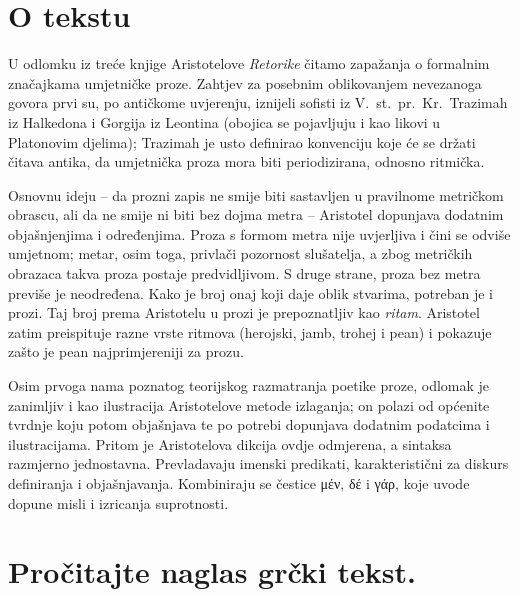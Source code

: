 


\section*{O tekstu}

U odlomku iz treće knjige Aristotelove \textit{Retorike} čitamo zapažanja o formalnim značajkama umjetničke proze. Zahtjev za posebnim oblikovanjem nevezanoga govora prvi su, po antičkome uvjerenju, iznijeli sofisti iz V.~st.\ pr.~Kr.\ Trazimah iz Halkedona i Gorgija iz Leontina (obojica se pojavljuju i kao likovi u Platonovim djelima); Trazimah je usto definirao konvenciju koje će se držati čitava antika, da umjetnička proza mora biti periodizirana, odnosno ritmička.

Osnovnu ideju – da prozni zapis ne smije biti sastavljen u pravilnome metričkom obrascu, ali da ne smije ni biti bez dojma metra – Aristotel dopunjava dodatnim objašnjenjima i određenjima. Proza s formom metra nije uvjerljiva i čini se odviše umjetnom; metar, osim toga, privlači pozornost slušatelja, a zbog metričkih obrazaca takva proza postaje predvidljivom. S druge strane, proza bez metra previše je neodređena. Kako je broj onaj koji daje oblik stvarima, potreban je i prozi. Taj broj prema Aristotelu u prozi je prepoznatljiv kao \textit{ritam}. Aristotel zatim preispituje razne vrste ritmova (herojski, jamb, trohej i pean) i pokazuje zašto je pean najprimjereniji za prozu.

Osim prvoga nama poznatog teorijskog razmatranja poetike proze, odlomak je zanimljiv i kao ilustracija Aristotelove metode izlaganja; on polazi od općenite tvrdnje koju potom objašnjava te po potrebi dopunjava dodatnim podatcima i ilustracijama. Pritom je Aristotelova dikcija ovdje odmjerena, a sintaksa razmjerno jednostavna. Prevladavaju imenski predikati, karakteristični za diskurs definiranja i objašnjavanja. Kombiniraju se čestice μέν, δέ i γάρ, koje uvode dopune misli i izricanja suprotnosti.



\section*{Pročitajte naglas grčki tekst.}

